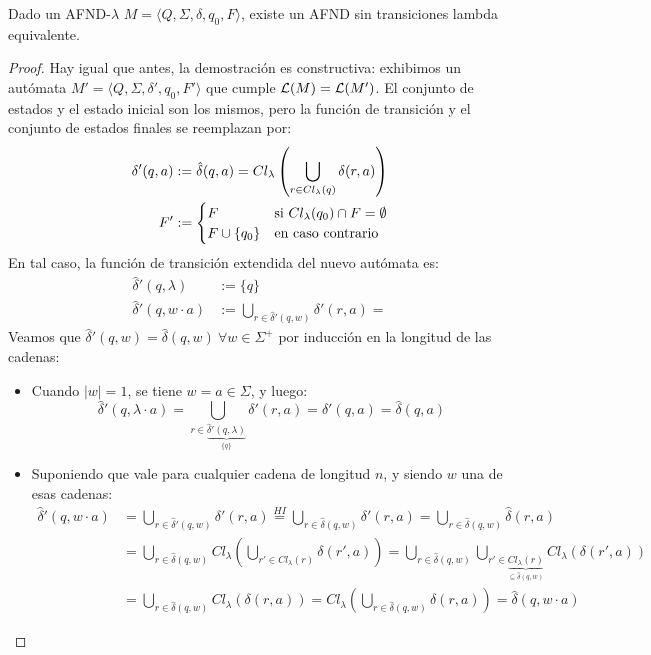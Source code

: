 \begin{theorem*}
    Dado un AFND-$\lambda$ $M = \langle Q, \Sigma, \delta, q_0, F \rangle$, existe un AFND sin transiciones lambda equivalente.
\end{theorem*}
\begin{proof}
    Hay igual que antes, la demostración es constructiva: exhibimos un autómata $M' = \langle Q, \Sigma, \delta', q_0, F' \rangle$ que cumple $\mathcal{L}(M) = \mathcal{L}(M')$. El conjunto de estados y el estado inicial son los mismos, pero la función de transición y el conjunto de estados finales se reemplazan por:
    $$
    \begin{aligned}
        \delta'(q, a) & := \hat \delta (q, a) = Cl_\lambda\left(\bigcup_{r \in Cl_\lambda(q)} \delta(r, a)\right) \\
        F' & := \begin{cases}
            F & \text{si } Cl_\lambda (q_0) \cap F = \emptyset \\
            F \cup \{q_0\} & \text{en caso contrario}
        \end{cases}
    \end{aligned}
    $$
    En tal caso, la función de transición extendida del nuevo autómata es:
    $$
    \begin{aligned}
        \hat \delta'(q, \lambda) & := \{q\} \\
        \hat \delta'(q, w \cdot a) & := \bigcup_{r \in \hat \delta'(q, w)} \delta'(r, a) = 
    \end{aligned}
    $$
    Veamos que $\hat \delta'(q, w) = \hat \delta(q, w) \ \forall w \in \Sigma^+$ por inducción en la longitud de las cadenas:
    \begin{itemize}
        \item Cuando $|w| = 1$, se tiene $w = a \in \Sigma$, y luego:
        $$
        \hat \delta'(q, \lambda \cdot a)
        = \bigcup_{r \in \underbrace{\hat \delta'(q, \lambda)}_{\{q\}} } \delta'(r, a)
        = \delta'(q, a) = \hat \delta(q, a)
        $$
        \item Suponiendo que vale para cualquier cadena de longitud $n$, y siendo $w$ una de esas cadenas:
        $$
        \begin{aligned}
            \hat \delta'(q, w \cdot a)
            & = \bigcup_{r \in \hat \delta'(q, w)} \delta'(r, a)
            \overset{HI}{=} \bigcup_{r \in \hat \delta(q, w)} \delta'(r, a)
            = \bigcup_{r \in \hat \delta(q, w)} \hat \delta(r, a) \\
            & = \bigcup_{r \in \hat \delta(q, w)} Cl_\lambda\left(\bigcup_{r' \in Cl_\lambda(r)} \delta(r', a)\right) = \bigcup_{r \in \hat \delta(q, w)} \bigcup_{r' \in \underbrace{Cl_\lambda(r)}_{\subseteq \hat \delta(q, w)}} Cl_\lambda(\delta(r', a)) \\
            & = \bigcup_{r \in \hat \delta(q, w)} Cl_\lambda(\delta(r, a)) = Cl_\lambda\left(\bigcup_{r \in \hat \delta(q, w)} \delta(r, a)\right) = \hat \delta (q, w \cdot a)
        \end{aligned}
        $$
    \end{itemize}


\end{proof}
